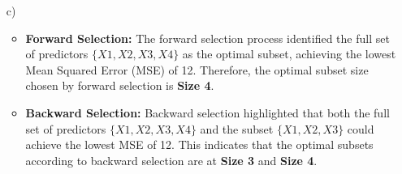 \documentclass{article}
\begin{document}
\begin{itemize}
\item[c)]
    \begin{itemize}
    \item \textbf{Forward Selection:} The forward selection process identified the full set of predictors \(\{X1, X2, X3, X4\}\) as the optimal subset, achieving the lowest Mean Squared Error (MSE) of 12. Therefore, the optimal subset size chosen by forward selection is \textbf{Size 4}.
    
    \item \textbf{Backward Selection:} Backward selection highlighted that both the full set of predictors \(\{X1, X2, X3, X4\}\) and the subset \(\{X1, X2, X3\}\) could achieve the lowest MSE of 12. This indicates that the optimal subsets according to backward selection are at \textbf{Size 3} and \textbf{Size 4}.
\end{itemize}

\end{itemize}
\newpage
\end{document}
